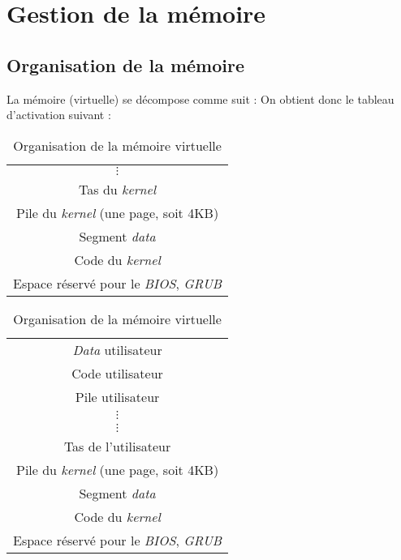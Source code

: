 \documentclass[a4paper, 10pt, french]{article}
\newcommand{\foreign}[1]{\emph{#1}}
\begin{document}
\section{Gestion de la mémoire}

\subsection{Organisation de la mémoire}

La mémoire (virtuelle) se décompose comme suit :
On obtient donc le tableau d'activation suivant :
\begin{table}[H]
 \centering
 \begin{subtable}[h]{.5\linewidth}
 \centering
 \begin{tabular}{|c|}
 \hline
 $\vdots$ \\
 Tas du \foreign{kernel} \\
 \hline
 Pile du \foreign{kernel} (une page, soit 4KB) \\
 Segment \foreign{data} \\
 Code du \foreign{kernel} \\
 \hline
 Espace réservé pour le \foreign{BIOS}, \foreign{GRUB} \\
 \hline
\end{tabular}
\caption{Espace mémoire du noyau}
\end{subtable}


\begin{subtable}[h]{.5\linewidth}
 \centering
 \begin{tabular}{|c|}
  \hline
 \foreign{Data} utilisateur \\
 Code utilisateur \\
 \hline
 Pile utilisateur \\
 $\vdots$ \\
 \hline
 $\vdots$ \\
 Tas de l'utilisateur \\
 \hline
 Pile du \foreign{kernel} (une page, soit 4KB) \\
 Segment \foreign{data} \\
 Code du \foreign{kernel} \\
 \hline
 Espace réservé pour le \foreign{BIOS}, \foreign{GRUB} \\
 \hline
 \end{tabular}

 \caption{Espace mémoire de l'utilisateur}
\end{subtable}
\caption{Organisation de la mémoire virtuelle}
\end{table}
\end{document}
